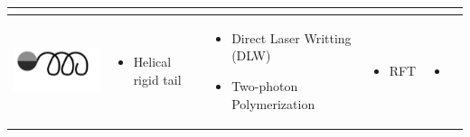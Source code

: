 \documentclass[12pt,a4paper,titlepage]{report}
\begin{document}
\begin{table}[h!]
\begin{tabular}{ c m{2.5cm}  m{4.3cm} m{3cm} m{2cm}}
\begin{minipage}[t]{3cm}
\begin{itemize}
      \end{itemize}
	 \end{minipage}
    \\ \hline

 \begin{minipage}{.3\textwidth}
      \includegraphics[width=\linewidth, height=25mm]{helical_rigid_tail}
    \end{minipage}
    &
    \begin{minipage}[t]{3cm}
      \begin{itemize}
        \item Helical rigid tail
      
      \end{itemize}
    \end{minipage}
    & 
    \begin{minipage}[t]{4cm}
      \begin{itemize}

        \item Direct Laser Writting (DLW)
	\item Two-photon Polymerization
   
      \end{itemize}
    \end{minipage}

	&
  \begin{minipage}[t]{3cm}
      \begin{itemize}
        \item RFT
    
      \end{itemize}
    \end{minipage}

	&

	   \begin{itemize}
        \item \citep{peyer2013bio}
   
      \end{itemize}
	
    \\ \hline



\end{tabular}
\end{table}
\end{document}
